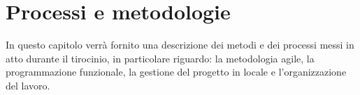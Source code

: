 
\chapter{Processi e metodologie}
\label{cap:processi-metodologie}

In questo capitolo verrà fornito una descrizione dei metodi e dei processi messi in atto durante il tirocinio, in particolare riguardo: la metodologia agile, la programmazione funzionale, la gestione del progetto in locale e l'organizzazione del lavoro.

